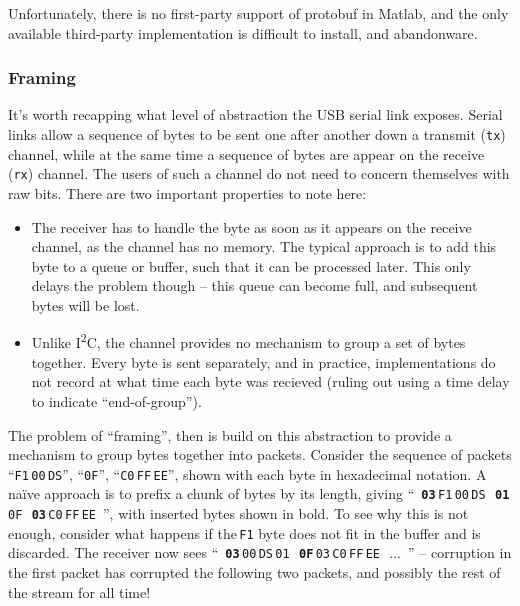 \documentclass[main.tex]{subfiles}
\begin{document}
		Unfortunately, there is no first-party support of protobuf in Matlab, and the only available third-party implementation \cite{protobuf-matlab} is difficult to install, and abandonware.\footnotemark


	\subsubsection{Framing}

		It's worth recapping what level of abstraction the USB serial link exposes.
		Serial links allow a sequence of bytes to be sent one after another down a transmit (\texttt{tx}) channel, while at the same time a sequence of bytes are appear on the receive (\texttt{rx}) channel. The users of such a channel do not need to concern themselves with raw bits. There are two important properties to note here:
		\begin{itemize}[noitemsep]
			\item
				The receiver has to handle the byte as soon as it appears on the receive channel, as the channel has no memory.
				The typical approach is to add this byte to a queue or buffer, such that it can be processed later.
				This only delays the problem though -- this queue can become full, and subsequent bytes will be lost.
			\item
				Unlike I\textsuperscript{2}C, the channel provides no mechanism to group a set of bytes together.
				Every byte is sent separately, and in practice, implementations do not record at what time each byte was recieved (ruling out using a time delay to indicate \enquote{end-of-group}).
		\end{itemize}

		The problem of \enquote{framing}, then is build on this abstraction to provide a mechanism to group bytes together into packets. Consider the sequence of packets
		\enquote{\texttt{F1}\,\texttt{00}\,\texttt{DS}},
		\enquote{\texttt{0F}},
		\enquote{\texttt{C0}\,\texttt{FF}\,\texttt{EE}}, shown with each byte in hexadecimal notation.
		A na\"ive approach is to prefix a chunk of bytes by its length, giving
		\mbox{\enquote{%
			\textbf{\texttt{03}}\,\texttt{F1}\,\texttt{00}\,\texttt{DS}\,%
			\textbf{\texttt{01}}\,\texttt{0F}\,%
			\textbf{\texttt{03}}\,\texttt{C0}\,\texttt{FF}\,\texttt{EE}%
		}}, with inserted bytes shown in bold.
		To see why this is not enough, consider what happens if the\,\texttt{F1} byte does not fit in the buffer and is discarded. The receiver now sees \mbox{\enquote{%
			\textbf{\texttt{03}}\,\texttt{00}\,\texttt{DS}\,\texttt{01}\,%
			\textbf{\texttt{0F}}\,\texttt{03}\,\texttt{C0}\,\texttt{FF}\,\texttt{EE}\,%
			...%
		}} -- corruption in the first packet has corrupted the following two packets, and possibly the rest of the stream for all time!
\end{document}
